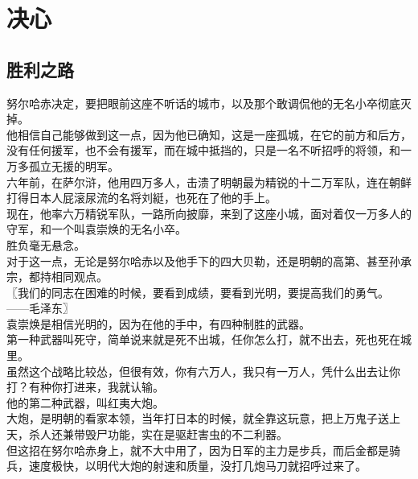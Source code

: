 \section{决心}
\ifnum{}
	\begin{multicols}{\theparacolNo}
\fi
\subsection{胜利之路}
努尔哈赤决定，要把眼前这座不听话的城市，以及那个敢调侃他的无名小卒彻底灭掉。\\

他相信自己能够做到这一点，因为他已确知，这是一座孤城，在它的前方和后方，没有任何援军，也不会有援军，而在城中抵挡的，只是一名不听招呼的将领，和一万多孤立无援的明军。\\

六年前，在萨尔浒，他用四万多人，击溃了明朝最为精锐的十二万军队，连在朝鲜打得日本人屁滚尿流的名将刘綎，也死在了他的手上。\\

现在，他率六万精锐军队，一路所向披靡，来到了这座小城，面对着仅一万多人的守军，和一个叫袁崇焕的无名小卒。\\

胜负毫无悬念。\\

对于这一点，无论是努尔哈赤以及他手下的四大贝勒，还是明朝的高第、甚至孙承宗，都持相同观点。\\

〖我们的同志在困难的时候，要看到成绩，要看到光明，要提高我们的勇气。\\

——毛泽东〗\\

袁崇焕是相信光明的，因为在他的手中，有四种制胜的武器。\\

第一种武器叫死守，简单说来就是死不出城，任你怎么打，就不出去，死也死在城里。\\

虽然这个战略比较怂，但很有效，你有六万人，我只有一万人，凭什么出去让你打？有种你打进来，我就认输。\\

他的第二种武器，叫红夷大炮。\\

大炮，是明朝的看家本领，当年打日本的时候，就全靠这玩意，把上万鬼子送上天，杀人还兼带毁尸功能，实在是驱赶害虫的不二利器。\\

但这招在努尔哈赤身上，就不大中用了，因为日军的主力是步兵，而后金都是骑兵，速度极快，以明代大炮的射速和质量，没打几炮马刀就招呼过来了。\\


\end{multicols}
